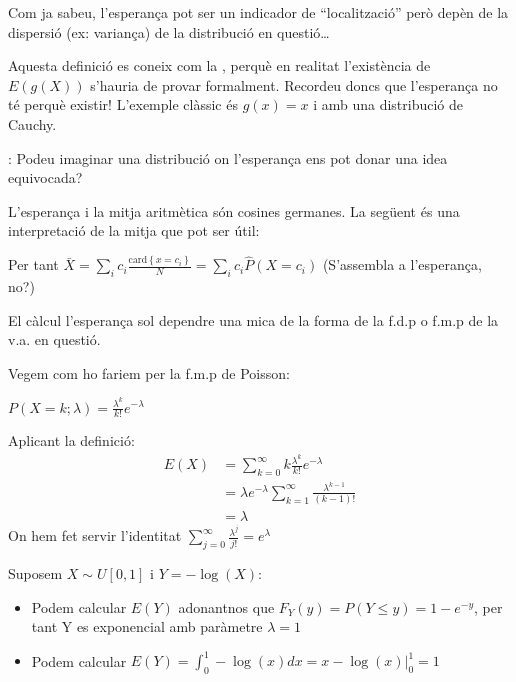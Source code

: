 \documentclass[letterpaper,10pt,english]{sphinxmanual}
\let\sphinxpxdimen\pdfpxdimen\else\newdimen\sphinxpxdimen
\begin{document}
Com ja sabeu, l’esperança pot ser un indicador de “localització” però depèn de la dispersió
(ex: variança) de la distribució en questió…

Aquesta definició es coneix com la ,
perquè en realitat l’existència de \(E\left(g\left(X\right)\right)\) s’hauria de provar formalment.
Recordeu doncs que l’esperança no té perquè existir! L’exemple clàssic és \(g(x)=x\) i amb una distribució de Cauchy.

: Podeu imaginar una distribució on l’esperança ens pot donar una idea equivocada?

L’esperança i la mitja aritmètica són cosines germanes. La següent és una interpretació
de la mitja que pot ser útil:

\begin{figure}[htbp]
\centering

\noindent\sphinxincludegraphics[height=330\sphinxpxdimen]{{mitja_Esperança}.png}
\end{figure}

Per tant \(\bar{X} = \sum_{i} c_i \frac{\mbox{card}\left\{x=c_i\right\}}{N} = \sum_{i} c_i \hat{P}\left(X = c_i\right)\) (S’assembla a l’esperança, no?)

El càlcul l’esperança sol dependre una mica de la forma de la f.d.p o f.m.p
de la v.a. en questió.

Vegem com ho fariem per la f.m.p de Poisson:

\(P\left(X = k; \lambda \right) = \frac{\lambda^k}{k!}e^{-\lambda}\)

Aplicant la definició:
\begin{equation*}
\begin{split}E(X) & = \sum_{k=0}^{\infty} k \frac{\lambda^k}{k!}e^{-\lambda} \\
     & = \lambda e^{-\lambda} \sum_{k=1}^{\infty} \frac{\lambda^{k-1}}{\left(k-1\right)!} \\
     & = \lambda\end{split}
\end{equation*}
On hem fet servir l’identitat \(\sum_{j=0}^{\infty} \frac{\lambda^{j}}{j!}=e^{\lambda}\)

Suposem \(X \sim U[0, 1]\) i \(Y=-\log(X)\):
\begin{itemize}
\item {} 
Podem calcular \(E(Y)\) adonant\sphinxhyphen{}nos que \(F_Y(y)=P(Y \leq y) = 1 - e^{-y}\), per tant Y es exponencial amb paràmetre \(\lambda=1\)

\item {} 
Podem calcular \(E(Y) = \int_{0}^1 -\log(x)dx=x - \log(x)|^1_0=1\)

\end{itemize}
\end{document}
